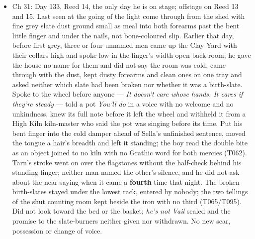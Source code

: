 \documentclass{design/chronicle}
\begin{document}
{\begin{itemize}[leftmargin=1.4em,itemsep=1pt,topsep=3pt,parsep=0pt]
\item Ch 31: Day 133, Reed 14, the only day he is on stage; offstage on Reed 13 and 15. Last seen at the going of the light come through from the shed with fine grey slate dust ground small as meal into both forearms past the bent little finger and under the nails, not bone-coloured slip. Earlier that day, before first grey, three or four unnamed men came up the Clay Yard with their collars high and spoke low in the finger’s-width-open back room; he gave the house no name for them and did not say the room was cold, came through with the dust, kept dusty forearms and clean ones on one tray and asked neither which slate had been broken nor whether it was a birth-slate. Spoke to the wheel before anyone — \emph{It doesn’t care whose hands. It cares if they’re steady} — told a pot \emph{You’ll do} in a voice with no welcome and no unkindness, knew its full note before it left the wheel and withheld it from a High Kiln kiln-master who said the pot was singing before its time. Put his bent finger into the cold damper ahead of Sella’s unfinished sentence, moved the tongue a hair’s breadth and left it standing; the boy read the double bite as an object joined to no kiln with no Grathic word for both mercies (T062). Tarn’s stroke went on over the flagstones without the half-check behind his standing finger; neither man named the other’s silence, and he did not ask about the near-saying when it came a \textbf{fourth} time that night. The broken birth-slates stayed under the lowest rack, entered by nobody; the two tellings of the shut counting room kept beside the iron with no third (T065/T095). Did not look toward the bed or the basket; \emph{he’s not Vail} sealed and the promise to the slate-burners neither given nor withdrawn. No new scar, possession or change of voice.

\end{itemize}

\begin{itemize}[leftmargin=1.4em,itemsep=1pt,topsep=3pt,parsep=0pt]


\end{itemize}}
\end{document}
